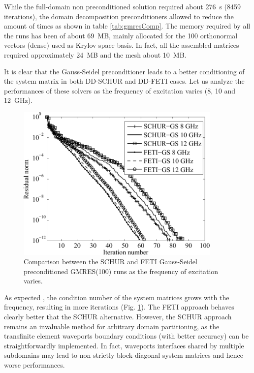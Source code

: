 While the full-domain non preconditioned solution required about 276~s (8459 iterations), the domain decomposition preconditioners allowed to reduce the amount of times as shown in table \ref{tab:gmresComp}. The memory required by all the runs has been of about 69~MB, mainly allocated for the 100 orthonormal vectors (dense) used as Krylov space basis. In fact, all the assembled matrices required approximately 24~MB and the mesh about 10~MB.

It is clear that the Gauss-Seidel preconditioner leads to a better conditioning of the system matrix in both DD-SCHUR and DD-FETI cases. Let us analyze the performances of these solvers as the frequency of excitation varies (8, 10 and 12~GHz).

\begin{figure}[h!]
\centering
\includegraphics[width=10cm]{DDfreqComp}
\caption{Comparison between the SCHUR and FETI Gauss-Seidel preconditioned GMRES(100) runs as the frequency of excitation varies.}
\label{fig:DDfreqComp}
\end{figure}

As expected \cite{dyczij1999efficient}, the condition number of the system matrices grows with the frequency, resulting in more iterations (Fig. \ref{fig:DDfreqComp}). The FETI approach behaves clearly better that the SCHUR alternative. However, the SCHUR approach remains an invaluable method for arbitrary domain partitioning, as the transfinite element waveports boundary conditions (with better accuracy) can be straightforwardly implemented. In fact, waveports interfaces shared by multiple subdomains may lead to non strictly block-diagonal system matrices and hence worse performances.

